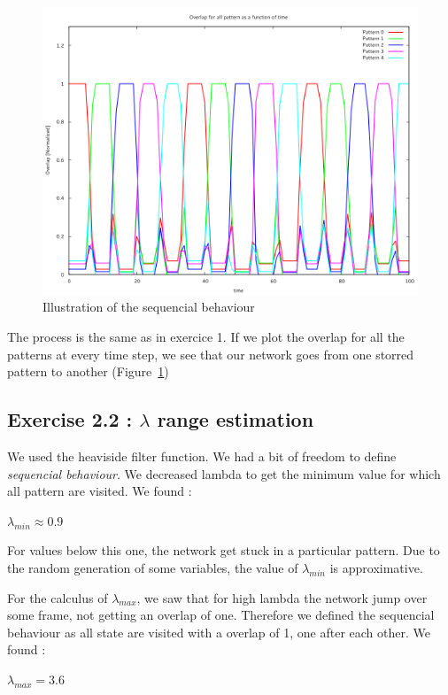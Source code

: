 \begin{figure}\label{seq}
    \begin{center}
    \caption{Illustration of the sequencial behaviour}
    \includegraphics[scale=0.3]{img/ex21.png}
    \end{center}
\end{figure}
The process is the same as in exercice 1. If we plot the overlap for all the patterns at every
time step, we see that our network goes from one storred pattern to another (Figure~\ref{seq})


\subsection{Exercise 2.2 : $\lambda$ range estimation}
We used the heaviside filter function. We had a bit
of freedom to define {\it sequencial behaviour}. We decreased lambda to get the minimum value
for which all pattern are visited. We found :
\begin{center}
$\lambda_{min} \approx 0.9$
\end{center}
For values below this one, the network get stuck in a particular pattern. Due to the random generation
of some variables, the value of $\lambda_{min}$ is approximative.


For the calculus of $\lambda_{max}$, we saw that for high lambda the network jump over some frame, not
getting an overlap of one. Therefore we defined the sequencial behaviour as all state are visited with a overlap of 1, 
one after each other.
We found :
\begin{center}
$\lambda_{max} = 3.6$
\end{center}

